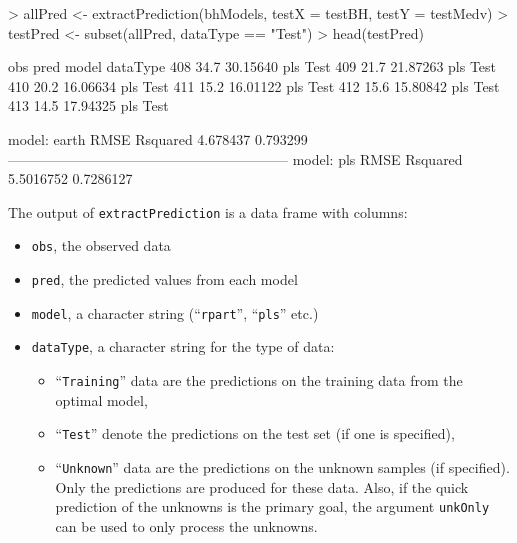\documentclass[12pt]{article}
\begin{document}
\begin{small}
\begin{Schunk}
\begin{Sinput}
> allPred <- extractPrediction(bhModels, testX = testBH, testY = testMedv)
> testPred <- subset(allPred, dataType == "Test")
> head(testPred)
\end{Sinput}
\begin{Soutput}
     obs     pred model dataType
408 34.7 30.15640   pls     Test
409 21.7 21.87263   pls     Test
410 20.2 16.06634   pls     Test
411 15.2 16.01122   pls     Test
412 15.6 15.80842   pls     Test
413 14.5 17.94325   pls     Test
\end{Soutput}
\begin{Soutput}
model: earth
    RMSE Rsquared 
4.678437 0.793299 
------------------------------------------------------------ 
model: pls
     RMSE  Rsquared 
5.5016752 0.7286127 
\end{Soutput}
\end{Schunk}
\end{small}
The output of \texttt{extractPrediction} is a data frame with columns:
   \begin{itemize}   
      \item \texttt{obs}, the observed data
      \item \texttt{pred}, the predicted values from each model
      \item \texttt{model}, a character string (``\texttt{rpart}'', ``\texttt{pls}'' etc.)
      \item \texttt{dataType}, a character string for the type of data:
      \begin{itemize}
         \item ``\texttt{Training}'' data are the predictions on the training data from
            the optimal model,
         \item ``\texttt{Test}'' denote the predictions on the test set (if one is specified),
         \item ``\texttt{Unknown}'' data are the predictions on the unknown samples (if specified). 
         Only the predictions are produced for these data. Also, if the quick prediction of the unknowns
         is the primary goal, the argument \texttt{unkOnly} can be used to only process the unknowns.
      \end{itemize}
   \end{itemize}      
\end{document}
